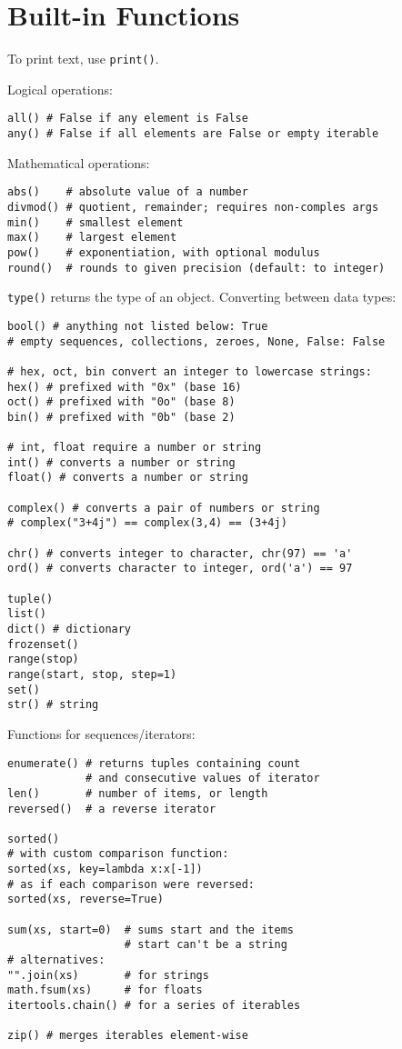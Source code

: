 \section{Built-in Functions}
To print text, use \texttt{print()}.

Logical operations:
\begin{verbatim}
all() # False if any element is False
any() # False if all elements are False or empty iterable
\end{verbatim}

Mathematical operations:
\begin{verbatim}
abs()    # absolute value of a number
divmod() # quotient, remainder; requires non-comples args
min()    # smallest element
max()    # largest element
pow()    # exponentiation, with optional modulus
round()  # rounds to given precision (default: to integer)
\end{verbatim}

\texttt{type()} returns the type of an object.
Converting between data types:
\begin{verbatim}
bool() # anything not listed below: True
# empty sequences, collections, zeroes, None, False: False

# hex, oct, bin convert an integer to lowercase strings:
hex() # prefixed with "0x" (base 16)
oct() # prefixed with "0o" (base 8)
bin() # prefixed with "0b" (base 2)

# int, float require a number or string
int() # converts a number or string
float() # converts a number or string

complex() # converts a pair of numbers or string
# complex("3+4j") == complex(3,4) == (3+4j)

chr() # converts integer to character, chr(97) == 'a'
ord() # converts character to integer, ord('a') == 97

tuple()
list()
dict() # dictionary
frozenset()
range(stop)
range(start, stop, step=1)
set()
str() # string
\end{verbatim}

Functions for sequences/iterators:
\begin{verbatim}
enumerate() # returns tuples containing count
            # and consecutive values of iterator
len()       # number of items, or length
reversed()  # a reverse iterator

sorted()
# with custom comparison function:
sorted(xs, key=lambda x:x[-1])
# as if each comparison were reversed:
sorted(xs, reverse=True)

sum(xs, start=0)  # sums start and the items
                  # start can't be a string
# alternatives:
"".join(xs)       # for strings
math.fsum(xs)     # for floats
itertools.chain() # for a series of iterables

zip() # merges iterables element-wise
\end{verbatim}

